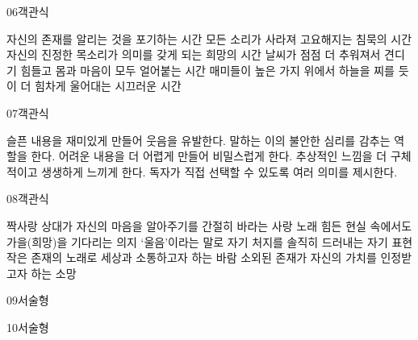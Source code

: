 \documentclass[fs9,seriesFre]{korfarm-base}
\begin{document}
\begin{kfQBlock}{06}{객관식}
\begin{kfChoices}
\kfChoice 자신의 존재를 알리는 것을 포기하는 시간
\kfChoice 모든 소리가 사라져 고요해지는 침묵의 시간
\kfChoice 자신의 진정한 목소리가 의미를 갖게 되는 희망의 시간
\kfChoice 날씨가 점점 더 추워져서 견디기 힘들고 몸과 마음이 모두 얼어붙는 시간
\kfChoice 매미들이 높은 가지 위에서 하늘을 찌를 듯이 더 힘차게 울어대는 시끄러운 시간
\end{kfChoices}
\end{kfQBlock}
\begin{kfQBlock}{07}{객관식}
\begin{kfChoices}
\kfChoice 슬픈 내용을 재미있게 만들어 웃음을 유발한다.
\kfChoice 말하는 이의 불안한 심리를 감추는 역할을 한다.
\kfChoice 어려운 내용을 더 어렵게 만들어 비밀스럽게 한다.
\kfChoice 추상적인 느낌을 더 구체적이고 생생하게 느끼게 한다.
\kfChoice 독자가 직접 선택할 수 있도록 여러 의미를 제시한다.
\end{kfChoices}
\end{kfQBlock}
\begin{kfQBlock}{08}{객관식}
\begin{kfChoices}
\kfChoice 짝사랑 상대가 자신의 마음을 알아주기를 간절히 바라는 사랑 노래
\kfChoice 힘든 현실 속에서도 가을(희망)을 기다리는 의지
\kfChoice ‘울음’이라는 말로 자기 처지를 솔직히 드러내는 자기 표현
\kfChoice 작은 존재의 노래로 세상과 소통하고자 하는 바람
\kfChoice 소외된 존재가 자신의 가치를 인정받고자 하는 소망
\end{kfChoices}
\end{kfQBlock}
\begin{kfQBlock}{09}{서술형}
\end{kfQBlock}
\begin{kfQBlock}{10}{서술형}
\end{kfQBlock}
\kfEndMC
\end{document}
